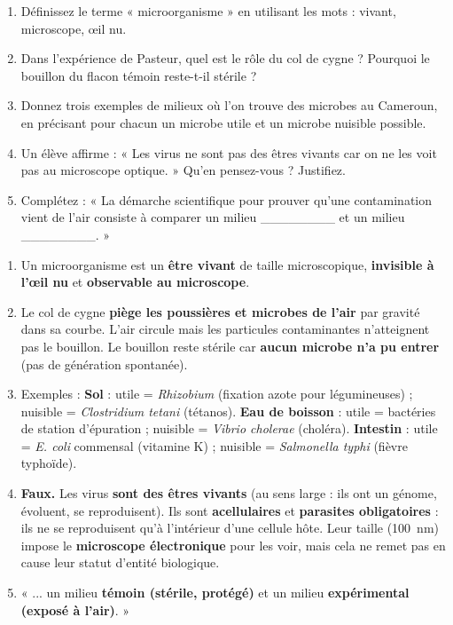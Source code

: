 \documentclass[11pt]{article}
\begin{document}
\begin{exercice}
\begin{enumerate}
    \item Définissez le terme « microorganisme » en utilisant les mots : vivant, microscope, œil nu.
    \item Dans l'expérience de Pasteur, quel est le rôle du col de cygne ? Pourquoi le bouillon du flacon témoin reste-t-il stérile ?
    \item Donnez trois exemples de milieux où l'on trouve des microbes au Cameroun, en précisant pour chacun un microbe utile et un microbe nuisible possible.
    \item Un élève affirme : « Les virus ne sont pas des êtres vivants car on ne les voit pas au microscope optique. » Qu'en pensez-vous ? Justifiez.
    \item Complétez : « La démarche scientifique pour prouver qu'une contamination vient de l'air consiste à comparer un milieu \_\_\_\_\_\_\_\_ et un milieu \_\_\_\_\_\_\_\_. »
\end{enumerate}
\end{exercice}

\begin{corrige}[Exercice n°1]
\begin{enumerate}
    \item Un microorganisme est un \textbf{être vivant} de taille microscopique, \textbf{invisible à l'œil nu} et \textbf{observable au microscope}.
    \item Le col de cygne \textbf{piège les poussières et microbes de l'air} par gravité dans sa courbe. L'air circule mais les particules contaminantes n'atteignent pas le bouillon. Le bouillon reste stérile car \textbf{aucun microbe n'a pu entrer} (pas de génération spontanée).
    \item Exemples : \textbf{Sol} : utile = \emph{Rhizobium} (fixation azote pour légumineuses) ; nuisible = \emph{Clostridium tetani} (tétanos). \textbf{Eau de boisson} : utile = bactéries de station d'épuration ; nuisible = \emph{Vibrio cholerae} (choléra). \textbf{Intestin} : utile = \emph{E. coli} commensal (vitamine K) ; nuisible = \emph{Salmonella typhi} (fièvre typhoïde).
    \item \textbf{Faux.} Les virus \textbf{sont des êtres vivants} (au sens large : ils ont un génome, évoluent, se reproduisent). Ils sont \textbf{acellulaires} et \textbf{parasites obligatoires} : ils ne se reproduisent qu'à l'intérieur d'une cellule hôte. Leur taille (\approx \SI{100}{nm}) impose le \textbf{microscope électronique} pour les voir, mais cela ne remet pas en cause leur statut d'entité biologique.
    \item « ... un milieu \textbf{témoin (stérile, protégé)} et un milieu \textbf{expérimental (exposé à l'air)}. »
\end{enumerate}
\end{corrige}
\end{document}
